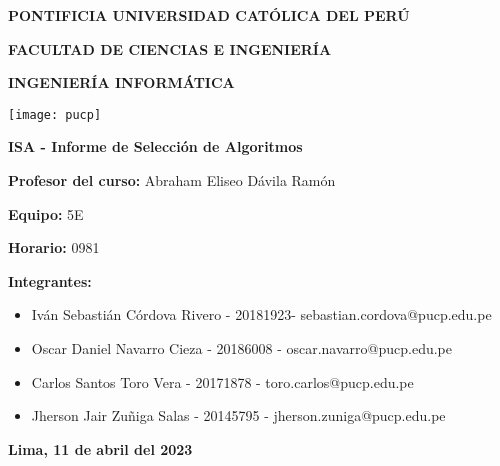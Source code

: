 
\begin{titlepage}
    \begin{center}
        \Large
        \textbf{PONTIFICIA UNIVERSIDAD CATÓLICA DEL PERÚ}

        \textbf{FACULTAD DE CIENCIAS E INGENIERÍA}

        \textbf{INGENIERÍA INFORMÁTICA}

        \vspace{0.5cm}
        \texttt{[image: pucp]}

        \vspace{1.5cm}
        \textbf{ISA - Informe de Selección de Algoritmos}
    \end{center}
    \large
    \vspace{1cm}

    \textbf{Profesor del curso: } Abraham Eliseo Dávila Ramón
    \vspace{0.5cm}

    \textbf{Equipo: } 5E
    \vspace{0.5cm}

    \textbf{Horario: } 0981
    \vspace{0.5cm}

    \textbf{Integrantes:}
    \vspace{0.5cm}

    \begin{itemize}
        \item{Iván Sebastián Córdova Rivero - 20181923- sebastian.cordova@pucp.edu.pe}
        \item{Oscar Daniel Navarro Cieza - 20186008 - oscar.navarro@pucp.edu.pe}
        \item{Carlos Santos Toro Vera - 20171878 - toro.carlos@pucp.edu.pe}
        \item{Jherson Jair Zuñiga Salas - 20145795 - jherson.zuniga@pucp.edu.pe}
    \end{itemize}

    \begin{center}
        \vspace*{2cm}
        \textbf{Lima, 11 de abril del 2023}
    \end{center}
\end{titlepage}

